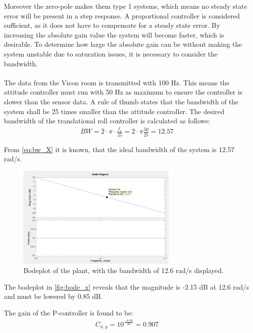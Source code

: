 Moreover the zero-pole makes them type 1 systems, which means no steady state error will be present in a step response. 
A proportional controller is considered sufficient, as it does not have to compensate for a steady state error. By increasing the absolute gain value the system will become faster, which is desirable. To determine how large the absolute gain can be without making the system unstable due to saturation issues, it is necessary to consider the bandwidth. \\ \\
The data from the Vicon room is transmitted with 100 Hz. This means the attitude controller must run with 50 Hz as maximum to ensure the controller is slower than the sensor data. A rule of thumb states that the bandwidth of the system shall be 25 times smaller than the attitude controller. The desired bandwidth of the translational roll controller is calculated as follows:
\begin{align}
BW=2\cdot \pi\cdot \frac{f_s}{25}=2\cdot \pi \frac{50}{25}=12.57\label{eq:bw_X}
\end{align}
\begin{where}
\end{where}

From \autoref{eq:bw_X} it is known, that the ideal bandwidth of the system is 12.57 rad/s. 
\begin{figure}[H]
	\centering
	\includegraphics[width=0.7\textwidth]{figures/bode_x.png}
	\caption{Bodeplot of the plant, with the bandwidth of 12.6 rad/s displayed.}\label{fig:bode_x}
\end{figure}
The bodeplot in \autoref{fig:bode_x} reveals that the magnitude is -2.15 dB at 12.6 rad/s and must be lowered by 0.85 dB. 

The gain of the P-controller is found to be: 
\begin{align}
C_{x,y}=10^{\frac{-0.85}{20}}=0.907\\
\end{align}

